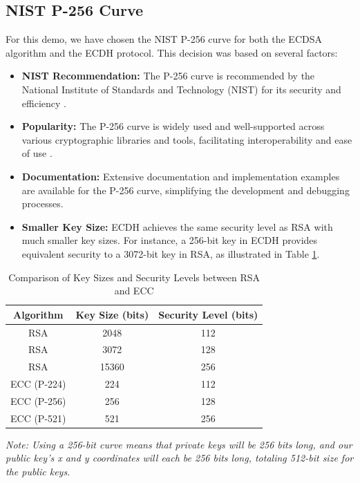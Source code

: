 \subsection{NIST P-256 Curve}
\label{curve_param}
For this demo, we have chosen the NIST P-256 curve for both the ECDSA algorithm and the ECDH protocol. This decision was based on several factors:

\begin{itemize}
    \item \textbf{NIST Recommendation:} The P-256 curve is recommended by the National Institute of Standards and Technology (NIST) for its security and efficiency \cite{nist_p256}.
    \item \textbf{Popularity:} The P-256 curve is widely used and well-supported across various cryptographic libraries and tools, facilitating interoperability and ease of use \cite{Telemetry}.
    \item \textbf{Documentation:} Extensive documentation and implementation examples are available for the P-256 curve, simplifying the development and debugging processes.
    \item \textbf{Smaller Key Size:} ECDH achieves the same security level as RSA with much smaller key sizes. For instance, a 256-bit key in ECDH provides equivalent security to a 3072-bit key in RSA, as illustrated in Table \ref{tab:rsa_vs_ecc}.
   
    
\end{itemize}
\begin{table}[H]
    \caption{Comparison of Key Sizes and Security Levels between RSA and ECC}
    \centering
    \begin{tabular}{|c|c|c|}
        \hline
        \textbf{Algorithm} & \textbf{Key Size (bits)} & \textbf{Security Level (bits)} \\
        \hline
      
        RSA & 2048 & 112 \\
        \hline
        RSA & 3072 & 128 \\
        \hline
        RSA & 15360 & 256 \\
        \hline
        ECC (P-224) & 224 & 112 \\
        \hline
        ECC (P-256) & 256 & 128 \\
        \hline
        ECC (P-521) & 521 & 256 \\
        \hline
    \end{tabular}

    \label{tab:rsa_vs_ecc}
\end{table}
\textit{Note: Using a 256-bit curve means that private keys will be 256 bits long, and our public key's x and y coordinates will each be 256 bits long, totaling 512-bit size for the public keys.}


